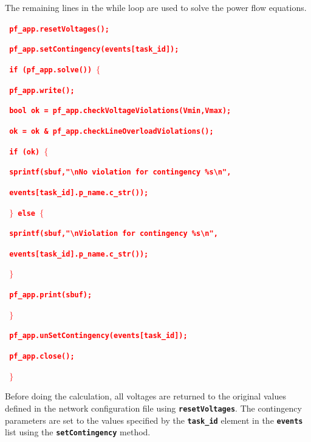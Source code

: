 \documentclass[12pt]{report} %
\begin{document}
The remaining lines in the while loop are used to solve the power flow equations.

\textcolor{red}{\texttt{\textbf{    pf\_app.resetVoltages();}}}

\textcolor{red}{\texttt{\textbf{    pf\_app.setContingency(events[task\_id]);}}}

\textcolor{red}{\texttt{\textbf{    if (pf\_app.solve()) $\boldsymbol{\mathrm{\{}}$}}}

\textcolor{red}{\texttt{\textbf{      pf\_app.write();}}}

\textcolor{red}{\texttt{\textbf{      bool ok = pf\_app.checkVoltageViolations(Vmin,Vmax);}}}

\textcolor{red}{\texttt{\textbf{      ok = ok \& pf\_app.checkLineOverloadViolations();}}}

\textcolor{red}{\texttt{\textbf{      if (ok) $\boldsymbol{\mathrm{\{}}$}}}

\textcolor{red}{\texttt{\textbf{        sprintf(sbuf,"{\textbackslash}nNo violation for contingency \%s{\textbackslash}n",}}}

\textcolor{red}{\texttt{\textbf{            events[task\_id].p\_name.c\_str());}}}

\textcolor{red}{\texttt{\textbf{      $\boldsymbol{\mathrm{\}}}$ else $\boldsymbol{\mathrm{\{}}$}}}

\textcolor{red}{\texttt{\textbf{        sprintf(sbuf,"{\textbackslash}nViolation for contingency \%s{\textbackslash}n",}}}

\textcolor{red}{\texttt{\textbf{            events[task\_id].p\_name.c\_str());}}}

\textcolor{red}{\texttt{\textbf{      $\boldsymbol{\mathrm{\}}}$}}}

\textcolor{red}{\texttt{\textbf{      pf\_app.print(sbuf);}}}

\textcolor{red}{\texttt{\textbf{    $\boldsymbol{\mathrm{\}}}$}}}

\textcolor{red}{\texttt{\textbf{    pf\_app.unSetContingency(events[task\_id]);}}}

\textcolor{red}{\texttt{\textbf{    pf\_app.close();}}}

\textcolor{red}{\texttt{\textbf{  $\boldsymbol{\mathrm{\}}}$}}}

Before doing the calculation, all voltages are returned to the original values defined in the network configuration file using \texttt{\textbf{resetVoltages}}. The contingency parameters are set to the values specified by the \texttt{\textbf{task\_id}} element in the \texttt{\textbf{events}} list using the \texttt{\textbf{setContingency}} method.
\end{document}

